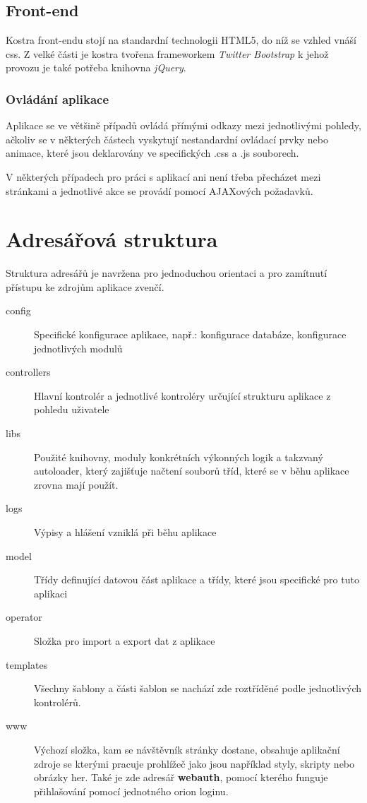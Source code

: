\documentclass[12pt,a4paper]{article}
\let\oldsection\section
\renewcommand\section{\clearpage\oldsection}
\begin{document}
{\subsection{Front-end}}
Kostra front-endu stojí na standardní technologii HTML5, do níž se vzhled vnáší css. Z velké části je kostra tvořena frameworkem \textit{Twitter Bootstrap} k jehož provozu je také potřeba knihovna \textit{jQuery}.
{\subsubsection{Ovládání aplikace}}
Aplikace se ve většině případů ovládá přímými odkazy mezi jednotlivými pohledy, ačkoliv se v některých částech vyskytují nestandardní ovládací prvky nebo animace, které jsou deklarovány ve specifických .css a .js souborech.

V některých případech pro práci s aplikací ani není třeba přecházet mezi stránkami a jednotlivé akce se provádí pomocí AJAXových požadavků.


{\section{Adresářová struktura}}
Struktura adresářů je navržena pro jednoduchou orientaci a pro zamítnutí přístupu ke zdrojům aplikace zvenčí.

\begin{description}
\item[config]
Specifické konfigurace aplikace, např.: konfigurace databáze, konfigurace jednotlivých modulů
\item[controllers]
Hlavní kontrolér a jednotlivé kontroléry určující strukturu aplikace z pohledu uživatele
\item[libs]
Použité knihovny, moduly konkrétních výkonných logik a takzvaný autoloader, který zajišťuje načtení souborů tříd, které se v běhu aplikace zrovna mají použít.
\item[logs]
Výpisy a hlášení vzniklá při běhu aplikace
\item[model]
Třídy definující datovou část aplikace a třídy, které jsou specifické pro tuto aplikaci
\item[operator]
Složka pro import a export dat z aplikace
\item[templates]
Všechny šablony a části šablon se nachází zde roztříděné podle jednotlivých kontrolérů.
\item[www]
Výchozí složka, kam se návštěvník stránky dostane, obsahuje aplikační zdroje se kterými pracuje prohlížeč jako jsou například styly, skripty nebo obrázky her. Také je zde adresář \textbf{webauth}, pomocí kterého funguje přihlašování pomocí jednotného orion loginu.
\end{description}
\end{document}
